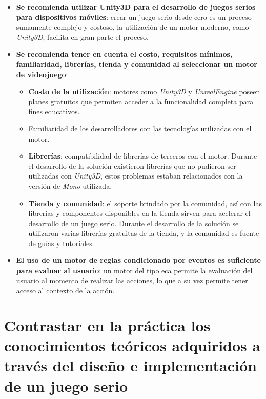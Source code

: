 \begin{itemize}

\item \textbf{Se recomienda utilizar Unity3D para el desarrollo de juegos serios para dispositivos móviles}: crear un juego serio desde cero es un proceso sumamente complejo y costoso, la utilización de un motor moderno, como \emph{Unity3D}, facilita en gran parte el proceso. 

\item \textbf{Se recomienda tener en cuenta el costo, requisitos mínimos, familiaridad, librerías, tienda y comunidad al seleccionar un motor de videojuego}:
        
    \begin{itemize}

    \item \textbf{Costo de la utilización}: motores como \emph{Unity3D} y \emph{UnrealEngine} poseen planes gratuitos que permiten acceder a  la funcionalidad completa para fines educativos.

    \item Familiaridad de los desarrolladores con las tecnologías utilizadas con el motor.

    \item \textbf{Librerías}: compatibilidad de librerías de terceros con el motor. Durante el desarrollo de la solución existieron librerías que no pudieron ser utilizadas con \emph{Unity3D}, estos problemas estaban relacionados con la versión de \emph{Mono} utilizada.

    \item \textbf{Tienda y comunidad}: el soporte brindado  por la comunidad, así con las librerías y componentes disponibles en la tienda sirven para acelerar el desarrollo de un juego serio. Durante el desarrollo de la solución se utilizaron varias librerías gratuitas de la tienda, y la comunidad es fuente de guías y tutoriales.

    \end{itemize}
    
\item \textbf{El uso de un motor de reglas condicionado por eventos es suficiente para evaluar al usuario}: un motor del tipo \gls{eca} permite la evaluación del usuario al momento de realizar las acciones, lo que a su vez permite tener acceso al contexto de la acción. 

\end{itemize}

\section[Puesta en práctica de conocimientos teóricos]%
{Contrastar en la práctica los conocimientos teóricos adquiridos a través del diseño e implementación de un juego serio}

